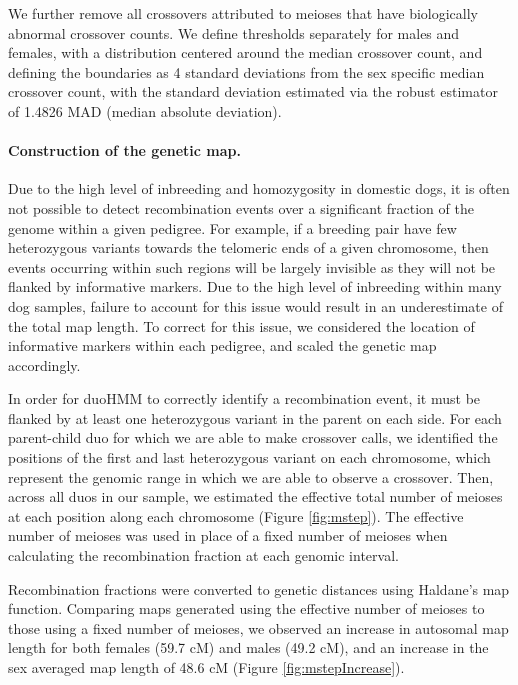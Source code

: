 We further remove all crossovers attributed to meioses that have biologically abnormal crossover counts.
We define thresholds separately for males and females, with a distribution centered around the median crossover count, and defining the boundaries as 4 standard deviations from the sex specific median crossover count, with the standard deviation estimated via the robust estimator of 1.4826 MAD (median absolute deviation).

\paragraph{Construction of the genetic map.}
Due to the high level of inbreeding and homozygosity in domestic dogs,
it is often not possible to detect recombination events over a significant fraction of the genome within a given pedigree.
For example, if a breeding pair have few heterozygous variants towards the telomeric ends of a given chromosome, then events occurring within such regions will be largely invisible as they will not be flanked by informative markers.
Due to the high level of inbreeding within many dog samples, failure to account for this issue would result in an underestimate of the total map length.
To correct for this issue, we considered the location of informative markers within each pedigree, and scaled the genetic map accordingly.

In order for duoHMM to correctly identify a recombination event, it must be flanked by at least one heterozygous variant in the parent on each side.
For each parent-child duo for which we are able to make crossover calls, we identified the positions of the first and last heterozygous variant on each chromosome, which represent the genomic range in which we are able to observe a crossover.
Then, across all duos in our sample, we estimated the effective total number of meioses at each position along each chromosome (Figure \ref{fig:mstep}).
The effective number of meioses was used in place of a fixed number of meioses when calculating the recombination fraction at each genomic interval.

Recombination fractions were converted to genetic distances using Haldane's map function.
Comparing maps generated using the effective number of meioses to those using a fixed number of meioses, we observed an increase in autosomal map length for both females (59.7 cM) and males (49.2 cM), and an increase in the sex averaged map length of 48.6 cM (Figure \ref{fig:mstepIncrease}).

